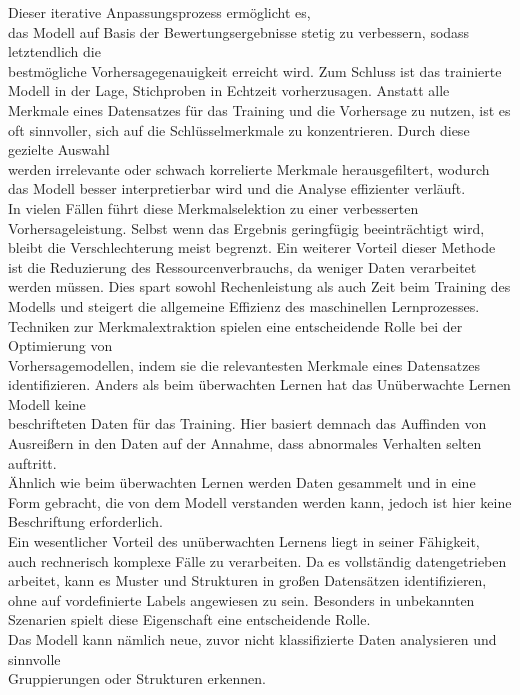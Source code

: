 Dieser iterative Anpassungsprozess ermöglicht es, \\ das Modell auf Basis der Bewertungsergebnisse stetig zu verbessern, sodass letztendlich die \\ bestmögliche Vorhersagegenauigkeit erreicht wird.
\nAbsatz
Zum Schluss ist das trainierte Modell in der Lage, Stichproben in Echtzeit vorherzusagen. Anstatt alle Merkmale eines Datensatzes für das Training und die Vorhersage zu nutzen, ist es oft sinnvoller, sich auf die Schlüsselmerkmale zu konzentrieren. Durch diese gezielte Auswahl \\ werden irrelevante oder schwach korrelierte Merkmale herausgefiltert, wodurch das Modell besser interpretierbar wird und die Analyse effizienter verläuft\cite{Lernen}\cite{OnlyPreprocessing}.
\\
In vielen Fällen führt diese Merkmalselektion zu einer verbesserten Vorhersageleistung. Selbst wenn das Ergebnis geringfügig beeinträchtigt wird, bleibt die Verschlechterung meist begrenzt. Ein weiterer Vorteil dieser Methode ist die Reduzierung des Ressourcenverbrauchs, da weniger Daten verarbeitet werden müssen. Dies spart sowohl Rechenleistung als auch Zeit beim Training des Modells und steigert die allgemeine Effizienz des maschinellen Lernprozesses\cite{Preprocessing}.
\\
Techniken zur Merkmalextraktion spielen eine entscheidende Rolle bei der Optimierung von \\ Vorhersagemodellen, indem sie die relevantesten Merkmale eines Datensatzes identifizieren\cite{Preprocessing}.
\nAbsatz
Anders als beim überwachten Lernen hat das Unüberwachte Lernen Modell keine \\ beschrifteten Daten für das Training. Hier basiert demnach das Auffinden von Ausreißern in den Daten auf der Annahme, dass abnormales Verhalten selten auftritt\cite{Lernen}.
\\
Ähnlich wie beim überwachten Lernen werden Daten gesammelt und in eine Form gebracht, die von dem Modell verstanden werden kann, jedoch ist hier keine Beschriftung erforderlich. \\ Ein wesentlicher Vorteil des unüberwachten Lernens liegt in seiner Fähigkeit, auch rechnerisch komplexe Fälle zu verarbeiten. Da es vollständig datengetrieben arbeitet, kann es Muster und Strukturen in großen Datensätzen identifizieren, ohne auf vordefinierte Labels angewiesen zu sein. Besonders in unbekannten Szenarien spielt diese Eigenschaft eine entscheidende Rolle. \\ Das Modell kann nämlich neue, zuvor nicht klassifizierte Daten analysieren und sinnvolle \\  Gruppierungen oder Strukturen erkennen.
